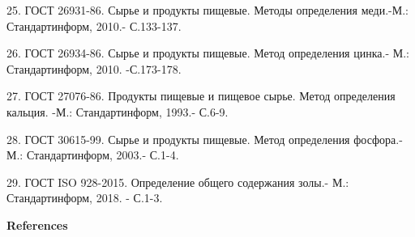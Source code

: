 \begin{references}
25. ГОСТ 26931-86. Сырье и продукты пищевые. Методы определения меди.-М.:
Стандартинформ, 2010.- С.133-137.

26. ГОСТ 26934-86. Сырье и продукты пищевые. Метод определения цинка.-
М.: Стандартинформ, 2010. -С.173-178.

27. ГОСТ 27076-86. Продукты пищевые и пищевое сырье. Метод определения
кальция. -М.: Стандартинформ, 1993.- С.6-9.

28. ГОСТ 30615-99. Сырье и продукты пищевые. Метод определения
фосфора.-М.: Стандартинформ, 2003.- С.1-4.

29. ГОСТ ISO 928-2015. Определение общего содержания золы.- М.:
Стандартинформ, 2018. - С.1-3.
\end{references}

\begin{center}
{\bfseries References}
\end{center}


